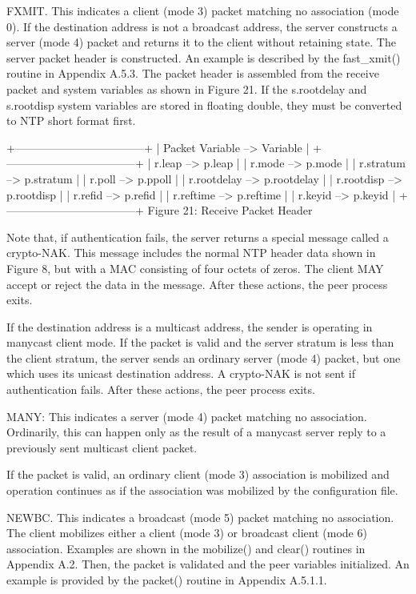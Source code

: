 FXMIT. This indicates a client (mode 3) packet matching no
association (mode 0). If the destination address is not a broadcast
address, the server constructs a server (mode 4) packet and returns
it to the client without retaining state. The server packet header
is constructed. An example is described by the fast\_xmit() routine
in Appendix A.5.3. The packet header is assembled from the receive
packet and system variables as shown in Figure 21. If the
s.rootdelay and s.rootdisp system variables are stored in floating
double, they must be converted to NTP short format first.

+-----------------------------------+
| Packet Variable --> Variable |
+-----------------------------------+
| r.leap --> p.leap |
| r.mode --> p.mode |
| r.stratum --> p.stratum |
| r.poll --> p.ppoll |
| r.rootdelay --> p.rootdelay |
| r.rootdisp --> p.rootdisp |
| r.refid --> p.refid |
| r.reftime --> p.reftime |
| r.keyid --> p.keyid |
+-----------------------------------+
Figure 21: Receive Packet Header

Note that, if authentication fails, the server returns a special
message called a crypto-NAK. This message includes the normal NTP
header data shown in Figure 8, but with a MAC consisting of four
octets of zeros. The client MAY accept or reject the data in the
message. After these actions, the peer process exits.

If the destination address is a multicast address, the sender is
operating in manycast client mode. If the packet is valid and the
server stratum is less than the client stratum, the server sends an
ordinary server (mode 4) packet, but one which uses its unicast
destination address. A crypto-NAK is not sent if authentication
fails. After these actions, the peer process exits.

MANY: This indicates a server (mode 4) packet matching no
association. Ordinarily, this can happen only as the result of a
manycast server reply to a previously sent multicast client packet.

If the packet is valid, an ordinary client (mode 3) association is
mobilized and operation continues as if the association was mobilized
by the configuration file.

NEWBC. This indicates a broadcast (mode 5) packet matching no
association. The client mobilizes either a client (mode 3) or
broadcast client (mode 6) association. Examples are shown in the
mobilize() and clear() routines in Appendix A.2. Then, the packet is
validated and the peer variables initialized. An example is provided
by the packet() routine in Appendix A.5.1.1.

